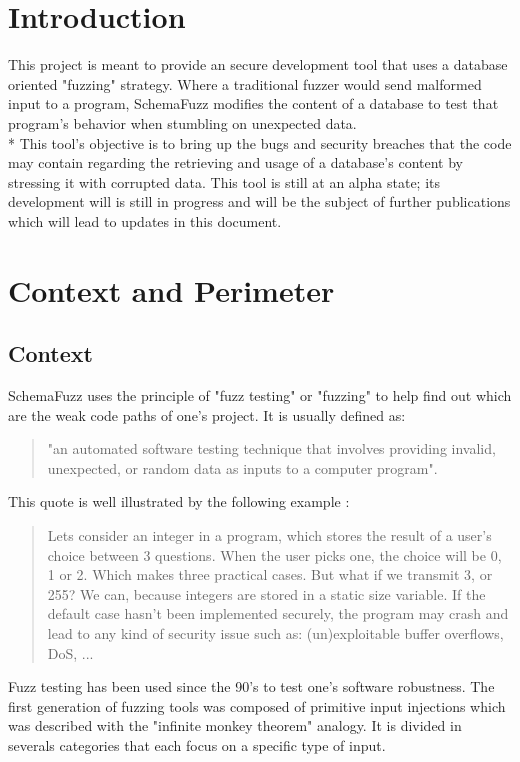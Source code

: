 \documentclass{article}
\begin{document}
\begin{empfile}
	
	\section{Introduction} 
	
This project is meant to provide an secure development tool that uses a database oriented "fuzzing" strategy.  
Where a traditional fuzzer would send malformed input to a program, SchemaFuzz modifies the content of a database to test that program's behavior when stumbling on  unexpected data. \\*
This tool's objective is to bring up the bugs and security breaches that the code may contain regarding the retrieving and usage  of a database's content by stressing it with corrupted data.
This tool is still at an alpha state; its development will is still in progress and will be the subject of further publications which will lead to updates in this document. 
	\clearpage

	
	\section{Context and Perimeter} 
		\subsection{Context}

SchemaFuzz uses the principle of "fuzz testing" or "fuzzing" to help find out which are the weak code paths of one's project. It is usually defined as: 

\begin{quotation} "an automated software testing technique that involves providing invalid, unexpected, or random data as inputs to a computer program". \end{quotation}\cite{fuzzing}		
	
This quote is well illustrated by the following example :
				\begin{quotation}
Lets consider an integer in a program, which stores the result of a user's choice between 3 questions. When the user picks one, the choice will be 0, 1 or 2. Which makes three practical cases. But what if we transmit 3, or 255? We can, because integers are stored in a static size variable. If the default case hasn't been implemented securely, the program may crash and lead to any kind of security issue such as: (un)exploitable buffer overflows, DoS, ... 
				\end{quotation}

Fuzz testing has been used since the 90's to test one's software robustness.
The first generation of fuzzing tools was composed of primitive input injections which was described with the "infinite monkey theorem" analogy.
It is divided in severals categories that each focus on a specific type of input.
 

\end{empfile}
\end{document}
